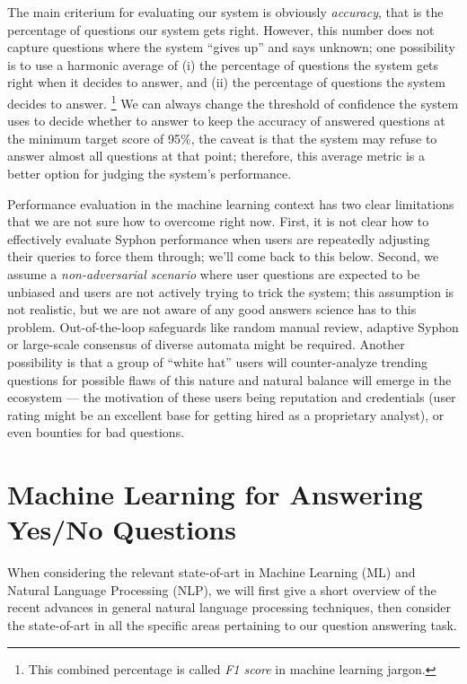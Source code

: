 \documentclass[11pt,a4paper]{article}
\begin{document}
The main criterium for evaluating our system is obviously \textit{accuracy},
that is the percentage of questions our system gets right.  However, this
number does not capture questions where the system ``gives up'' and says
unknown; one possibility is to use a harmonic average of (i) the percentage
of questions the system gets right when it decides to answer, and (ii) the
percentage of questions the system decides to answer.%
\footnote{This combined percentage is called \textit{F1 score} in machine learning jargon.}
We can always change the threshold of confidence the system uses to decide
whether to answer to keep the accuracy of answered questions at the minimum
target score of 95\%, the caveat is that the system may refuse to answer almost
all questions at that point; therefore, this average metric is a better
option for judging the system's performance.

Performance evaluation in the machine learning context has two clear limitations
that we are not sure how to overcome right now.  First, it is not clear how to
effectively evaluate Syphon performance when users are repeatedly adjusting
their queries to force them through; we'll come back to this below.
Second, we assume a \textit{non-adversarial scenario} where user questions
are expected to be unbiased and users are not actively trying to trick the system;
this assumption is not realistic, but we are not aware of any good answers science
has to this problem.  Out-of-the-loop safeguards like random manual review,
adaptive Syphon or large-scale consensus of diverse automata might be required.
Another possibility is that a group of ``white hat'' users will counter-analyze
trending questions for possible flaws of this nature and natural balance will
emerge in the ecosystem --- the motivation of these users being reputation and
credentials (user rating might be an excellent base for getting hired as a
proprietary analyst), or even bounties for bad questions.

\section{Machine Learning for Answering Yes/No Questions}
\label{ynml}

When considering the relevant state-of-art in Machine Learning (ML) and
Natural Language Processing (NLP), we will first give a short overview
of the recent advances in general natural language processing techniques,
then consider the state-of-art in all the specific areas pertaining to our question
answering task.
\end{document}

